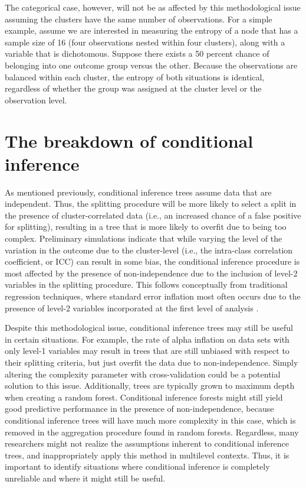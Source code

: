 	The categorical case, however, will not be as affected by this methodological issue assuming the clusters have the same number of observations. For a simple example, assume we are interested in measuring the entropy of a node that has a sample size of 16 (four observations nested within four clusters), along with a variable that is dichotomous. Suppose there exists a 50 percent chance of belonging into one outcome group versus the other. Because the observations are balanced within each cluster, the entropy of both situations is identical, regardless of whether the group was assigned at the cluster level or the observation level. 



\section{The breakdown of conditional inference}


	As mentioned previously, conditional inference trees assume data that are independent. Thus, the splitting procedure will be more likely to select a split in the presence of cluster-correlated data (i.e., an increased chance of a false positive for splitting), resulting in a tree that is more likely to overfit due to being too complex. Preliminary simulations indicate that while varying the level of the variation in the outcome due to the cluster-level (i.e., the intra-class correlation coefficient, or ICC) can result in some bias, the conditional inference procedure is most affected by the presence of non-independence due to the inclusion of level-2 variables in the splitting procedure. This follows conceptually from traditional regression techniques, where standard error inflation most often occurs due to the presence of level-2 variables incorporated at the first level of analysis \cite{luke2004multilevel}. 


	Despite this methodological issue, conditional inference trees may still be useful in certain situations. For example, the rate of alpha inflation on data sets with only level-1 variables may result in trees that are still unbiased with respect to their splitting criteria, but just overfit the data due to non-independence. Simply altering the complexity parameter with cross-validation could be a potential solution to this issue. Additionally, trees are typically grown to maximum depth when creating a random forest. Conditional inference forests might still yield good predictive performance in the presence of non-independence, because conditional inference trees will have much more complexity in this case, which is removed in the aggregation procedure found in random forests. Regardless, many researchers might not realize the assumptions inherent to conditional inference trees, and inappropriately apply this method in multilevel contexts. Thus, it is important to identify situations where conditional inference is completely unreliable and where it might still be useful.


